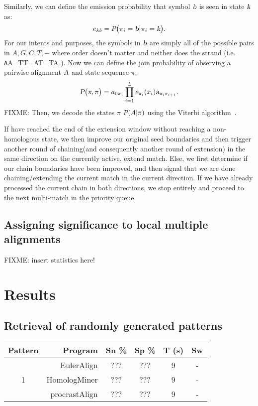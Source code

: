 \documentclass{ws-procs9x6}
\begin{document}
Similarly, we can define the emission probability that symbol $\textsl{b}$ is seen in state $\textsl{k}$ as:
\begin{equation}
e_{kb} = \textsl{P}\big(\pi_{i}=\textsl{b}\big|\pi_{i}=\textsl{k}\big).
\end{equation}
For our intents and purposes, the symbols in $\textsl{b}$ are simply all of the possible pairs in ${A,G,C,T,-}$ where order doesn't matter and neither does the strand (i.e. {\texttt AA=TT=AT=TA} ). Now we can define the join probability of observing a pairwise alignment $\textsl{A}$ and state sequence $\pi$:
\begin{equation}
\textsl{P}\big(\textsl{x},\pi\big) = a_{0\pi_{1}}\prod_{i=1}^\textsl{L}\textsl{e}_{\pi_{i}}(x_{i})\textsl{a}_{\pi_{i}\pi_{i+1}}.
\end{equation}
FIXME: Then, we decode the states $\pi$ $\textsl{P}(A |\pi)$ using the Viterbi algorithm~\cite{durbin}.

If have reached the end of the extension window without reaching a non-homologous state, we then improve our original seed boundaries and then trigger another round of chaining(and consequently another round of extension) in the same direction on the currently active, extend match. Else, we first determine if our chain boundaries have been improved, and then signal that we are done chaining/extending the current match in the current direction. If we have already processed the current chain in both directions, we stop entirely and proceed to the next multi-match in the priority queue.

\subsection{Assigning significance to local multiple alignments}
FIXME: insert statistics here!



\section{Results}
\subsection{Retrieval of randomly generated patterns}
\begin{table}[b]
\scriptsize
  \centering
\begin{tabular}{|c|rcccc|}
\hline Pattern & Program & Sn \% & Sp \% & T (s) & Sw \\
\hline
    & EulerAlign     &??? & ??? & 9 & - \\
  1 & HomologMiner  &??? & ??? & 9 & - \\
   &  procrastAlign  &??? & ??? & 9 & - \\


\hline
\end{tabular}
%
\end{table}
\end{document}
